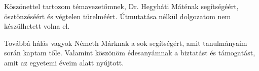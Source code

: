 Köszönettel tartozom témavezetőmnek, Dr. Hegyháti Máténak segítségéért, ösztönzéséért és végtelen türelméért. Útmutatása nélkül dolgozatom nem készülhetett volna el.

Továbbá hálás vagyok Németh Márknak a sok segítségért, amit tanulmányaim során kaptam tőle.
Valamint köszönöm édesanyámnak a biztatást és támogatást, amit az egyetemi éveim alatt nyújtott.